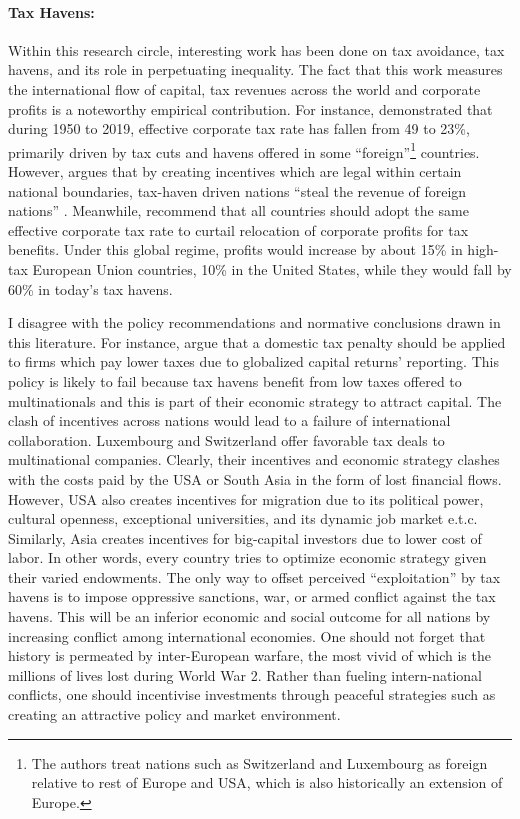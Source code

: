 \documentclass[12pt]{article}
\newcommand{\1}{\mathbbm 1}
\begin{document}
		
		\paragraph{Tax Havens:}
		
		Within this research circle, interesting work has been done on tax avoidance, tax havens, and its role in perpetuating inequality. The fact that this work measures the international flow of capital, tax revenues across the world and corporate profits is a noteworthy empirical contribution. For instance, \cite{clausing2021ending} demonstrated that during 1950 to 2019, effective corporate tax rate has fallen from 49 to 23\%, primarily driven by tax cuts and havens offered in some ``foreign''\footnote{The authors treat nations such as Switzerland and Luxembourg as foreign relative to rest of Europe and USA, which is also historically an extension of Europe.} countries. However, \cite{zucman2015hidden} argues that by creating incentives which are legal within certain national boundaries, tax-haven driven nations ``steal the revenue of foreign nations'' \cite{zucman2015hidden}. Meanwhile, \cite{torslov2023missing} recommend that  all countries should adopt  the  same  effective  corporate  tax  rate to curtail relocation of corporate profits for tax benefits. Under this global regime, profits would increase by about 15\% in high-tax European Union countries, 10\% in the United States, while they would fall by 60\% in today's tax havens. 
		
		I disagree with the policy recommendations and normative conclusions drawn in this literature. For instance, \cite{clausing2021ending} argue that a domestic tax penalty should be applied to firms which pay lower taxes due to globalized capital returns' reporting. This policy is likely to fail because tax havens benefit from low taxes offered to multinationals and this is part of their economic strategy to attract capital. The clash of incentives across nations would lead to a failure of international collaboration. Luxembourg and Switzerland offer favorable tax deals to multinational companies. Clearly, their incentives and economic strategy clashes with the costs paid by the USA or South Asia in the form of lost financial flows. However, USA also creates incentives for migration due to its political power, cultural openness, exceptional universities, and its dynamic job market e.t.c. Similarly, Asia creates incentives for big-capital investors due to lower cost of labor. In other words, every country tries to optimize economic strategy given their varied endowments. The only way to offset perceived ``exploitation'' by tax havens is to impose oppressive sanctions, war, or armed conflict against the tax havens. This will be an inferior economic and social outcome for all nations by increasing conflict among international economies. One should not forget that history is permeated by inter-European warfare, the most vivid of which is the millions of lives lost during World War 2. Rather than fueling intern-national conflicts, one should incentivise investments through peaceful strategies such as creating an attractive policy and market environment.
		
\end{document}
